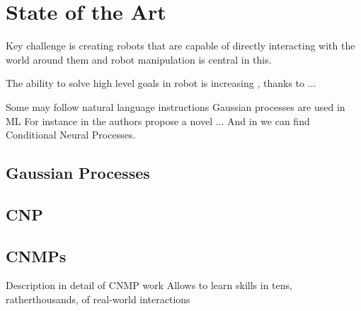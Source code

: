 \chapter{State of the Art} %
\label{chap:background}

Key challenge is creating robots that are capable of directly interacting with the world around them  and robot manipulation is central in this. \cite{kroemer2021review}
 
The ability to solve high level goals in robot is increasing \cite{gupta2019relay}, \cite{simeonov2021long} thanks to  ... 


Some may follow natural language instructions \cite{hu2019hierarchical}
%
Gaussian processes are used in ML \cite{seeger2004gaussian}
For instance in \cite{Ugur-RSS-19} the authors propose a novel ... 
And in \cite{DBLP:journals/corr/abs-1807-01613} we can find Conditional Neural Processes.

\section{Gaussian Processes}

\section{CNP}

\section{CNMPs}
Description in detail of CNMP work
Allows to learn skills in tens, ratherthousands, of real-world interactions